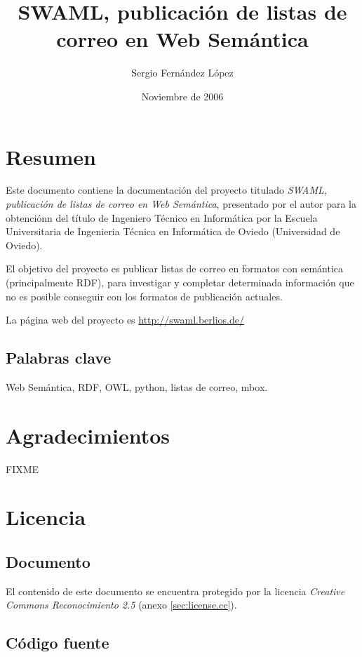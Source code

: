\documentclass[spanish,a4paper,10pt]{report}
\title{%
	SWAML, publicaci\'on de listas de correo en Web Sem\'antica}
\author{Sergio Fern\'andez L\'opez}
\date{Noviembre de 2006}
\begin{document}
\maketitle



\chapter*{Resumen}

Este documento contiene la documentación del proyecto titulado
\emph{SWAML, publicación de listas de correo en Web Semántica}, 
presentado por el autor para la obtenciónn del título de Ingeniero 
Técnico en Informática por la Escuela Universitaria de Ingenieria 
Técnica en Informática de Oviedo (Universidad de Oviedo).

El objetivo del proyecto es publicar listas de correo en formatos
con semántica (principalmente RDF), para investigar y completar
determinada información que no es posible conseguir con los formatos
de publicación actuales.

La página web del proyecto es \url{http://swaml.berlios.de/}

\section*{Palabras clave}

Web Semántica, RDF, OWL, python, listas de correo, mbox.

\chapter*{Agradecimientos}

FIXME

\chapter*{Licencia}

\section*{Documento}

El contenido de este documento se encuentra protegido por la licencia 
\emph{Creative Commons Reconocimiento 2.5} (anexo \ref{sec:license.cc}).

\section*{Código fuente}
\end{document}
